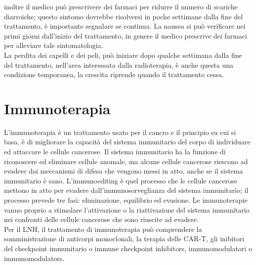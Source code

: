 inoltre il medico può prescrivere dei farmaci per ridurre il numero di scariche diarroiche; questo sintomo dovrebbe 
risolversi in poche settimane dalla fine del trattamento, è importante segnalare se continua. La nausea si può 
verificare nei primi giorni dall’inizio del trattamento, in genere il medico prescrive dei farmaci per alleviare 
tale sintomatologia.\\ 
La perdita dei capelli e dei peli, può iniziare dopo qualche settimana dalla fine del trattamento, nell’area 
interessata dalla radioterapia, è anche questa una condizione temporanea, la crescita riprende quando il trattamento 
cessa\cite{UKRADIOTP}.\\ 

\section{Immunoterapia}
L’immunoterapia è un trattamento usato per il cancro e il principio su cui si basa, è di migliorare la capacità 
del sistema immunitario del corpo di individuare ed attaccare le cellule cancerose. 
Il sistema immunitario ha la funzione di riconoscere ed eliminare cellule anomale, ma alcune cellule cancerose 
riescono ad evadere dai meccanismi di difesa che vengono messi in atto, anche se il sistema immunitario è sano. 
L’immunoediting è quel processo che le cellule cancerose mettono in atto per evadere dall’immunosorveglianza del 
sistema immunitario; il processo prevede tre fasi: eliminazione, equilibrio ed evasione. Le immunoterapie vanno 
proprio a stimolare l’attivazione o la riattivazione del sistema immunitario nei confronti delle cellule cancerose 
che sono riuscite ad evadere\cite{IMMUNOTP}.\\
Per il LNH, il trattamento di immunoterapia può comprendere la somministrazione di anticorpi monoclonali, 
la terapia delle CAR-T, gli inibitori del checkpoint immunitario o immune checkpoint inhibitors, 
immunomodulatori o immunomodulators.\\

